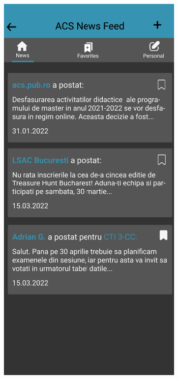 \begin{figure}[!ht]
    \centering
    \begin{minipage}[t]{0.4\textwidth}
        \captionsetup{justification=centering}
        \includegraphics[width=\textwidth]{figures/app/initial/news-feed-draft.png}

\end{minipage}
\end{figure}
